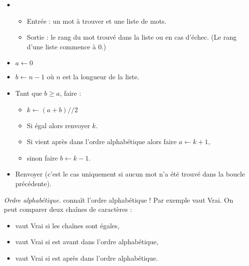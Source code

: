 \documentclass[11pt,class=report,crop=false]{standalone}
\begin{document}
\begin{activite}
\begin{enumerate}
  \begin{algorithme}
\sauteligne 
  
\begin{itemize}
  \item 
  \begin{itemize}
   \item Entrée : un mot à trouver et une liste de mots.
   
   \item Sortie : le rang du mot trouvé dans la liste ou  en cas d'échec. (Le rang d'une liste commence à $0$.)

  \end{itemize}

   \item $a \leftarrow 0$
      
   \item $b \leftarrow n -1$ où $n$ est la longueur de la liste.

   \item Tant que $b \ge a$, faire :
    \begin{itemize}
      \item $k \leftarrow (a+b)//2$
        
      \item Si  égal  alors renvoyer $k$.
      \item Si  vient après  dans l'ordre alphabétique alors faire $a\leftarrow k+1$,
      \item sinon faire $b \leftarrow k-1$.
    \end{itemize}
    
    \item Renvoyer  (c'est le cas uniquement si aucun mot n'a été trouvé dans la boucle précédente).
    
  \end{itemize}
 \end{algorithme}     
  
  \emph{Ordre alphabétique.} \Python{} connaît l'ordre alphabétique ! Par exemple \og{}\fg{} vaut \og{}Vrai\fg{}.
  On peut comparer deux chaînes de caractères : 
  \begin{itemize}
    \item {} vaut \og{}Vrai\fg{} si les chaînes sont égales,
    \item {} vaut \og{}Vrai\fg{} si  est avant  dans l'ordre alphabétique,
    \item {} vaut \og{}Vrai\fg{} si  est après  dans l'ordre alphabétique.
   \end{itemize}
   

\end{enumerate}
\end{activite}
\end{document}
